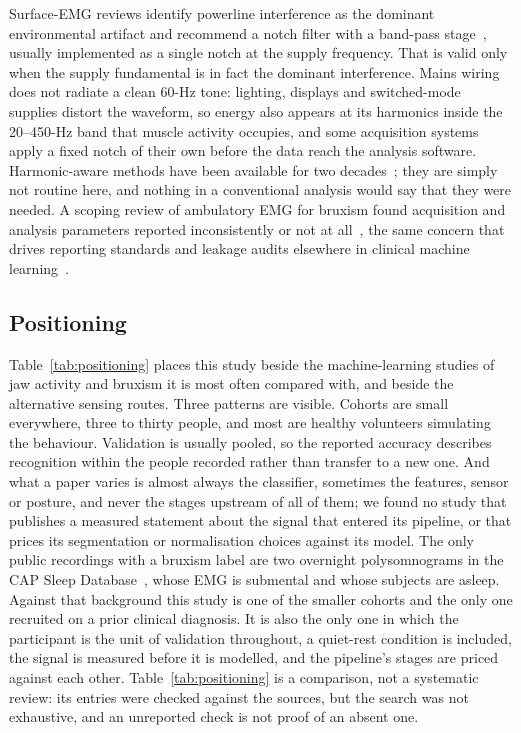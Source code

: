 \documentclass[journal]{IEEEtran}
\begin{document}
Surface-EMG reviews identify powerline interference as the dominant environmental artifact and recommend a notch filter with a band-pass stage~\cite{chowdhury2013surface,raez2006techniques}, usually implemented as a single notch at the supply frequency. That is valid only when the supply fundamental is in fact the dominant interference. Mains wiring does not radiate a clean 60-Hz tone: lighting, displays and switched-mode supplies distort the waveform, so energy also appears at its harmonics inside the 20--450-Hz band that muscle activity occupies, and some acquisition systems apply a fixed notch of their own before the data reach the analysis software. Harmonic-aware methods have been available for two decades~\cite{mewett2004reducing,levkov2005removal,keshtkaran2014fast,sornmo2005bioelectrical}; they are simply not routine here, and nothing in a conventional analysis would say that they were needed. A scoping review of ambulatory EMG for bruxism found acquisition and analysis parameters reported inconsistently or not at all~\cite{thymi2021signal}, the same concern that drives reporting standards and leakage audits elsewhere in clinical machine learning~\cite{collins2024tripod,kapoor2023leakage,varoquaux2022machine,pineau2021improving}.

\subsection{Positioning}

Table~\ref{tab:positioning} places this study beside the machine-learning studies of jaw activity and bruxism it is most often compared with, and beside the alternative sensing routes. Three patterns are visible. Cohorts are small everywhere, three to thirty people, and most are healthy volunteers simulating the behaviour. Validation is usually pooled, so the reported accuracy describes recognition within the people recorded rather than transfer to a new one. And what a paper varies is almost always the classifier, sometimes the features, sensor or posture, and never the stages upstream of all of them; we found no study that publishes a measured statement about the signal that entered its pipeline, or that prices its segmentation or normalisation choices against its model. The only public recordings with a bruxism label are two overnight polysomnograms in the CAP Sleep Database~\cite{terzano2001atlas,goldberger2000physiobank}, whose EMG is submental and whose subjects are asleep. Against that background this study is one of the smaller cohorts and the only one recruited on a prior clinical diagnosis. It is also the only one in which the participant is the unit of validation throughout, a quiet-rest condition is included, the signal is measured before it is modelled, and the pipeline's stages are priced against each other. Table~\ref{tab:positioning} is a comparison, not a systematic review: its entries were checked against the sources, but the search was not exhaustive, and an unreported check is not proof of an absent one.
\end{document}
